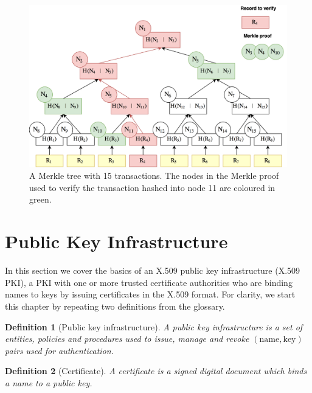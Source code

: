 \documentclass{style/kththesis}
\newtheorem{definition}{Definition}
\begin{document}
\begin{figure}[ht!]
    \centering
    \includegraphics[width=\textwidth]{figures/merkle-tree}
    \caption{A Merkle tree with 15 transactions. The nodes in the Merkle proof used to verify the transaction hashed into node 11 are coloured in green.}
    \label{fig:merkle-tree}
\end{figure}

\section{Public Key Infrastructure}
In this section we cover the basics of an X.509 public key infrastructure (X.509 PKI), a PKI with one or more trusted certificate authorities who are binding names to keys by issuing certificates in the X.509 format. For clarity, we start this chapter by repeating two definitions from the glossary.

\begin{definition}[Public key infrastructure]
A public key infrastructure is a set of entities, policies and procedures used to issue, manage and revoke $(\text{name}, \text{key})$ pairs used for authentication.
\end{definition}

\begin{definition}[Certificate]
A certificate is a signed digital document which binds a name to a public key.
\end{definition}
\end{document}
